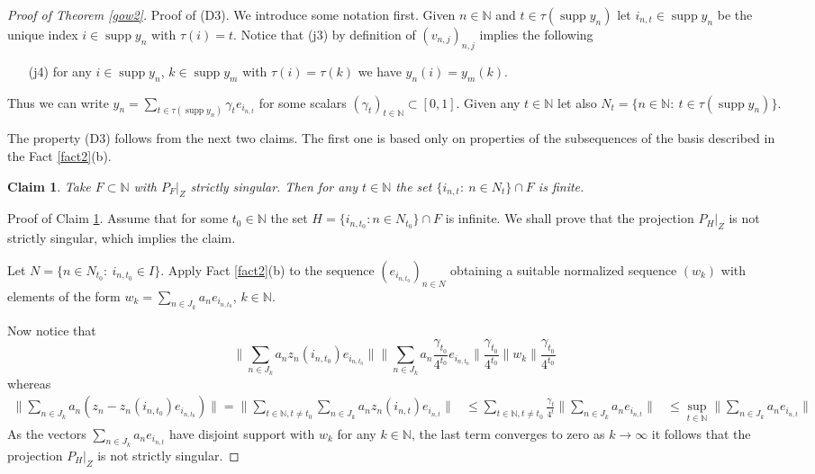\documentclass{amsart}
\newtheorem{claim}{Claim}
\numberwithin{subsection}{section}
\numberwithin{equation}{section}
\begin{document}
\begin{proof}[Proof of Theorem \ref{gow2}]
Proof of (D3). We introduce some notation first. Given $n\in{{\mathbb{N}}}$ and $t\in\tau (\operatorname{supp} y_n)$ let $i_{n,t}\in\operatorname{supp} y_n$ be the unique index $i\in \operatorname{supp} y_n$ with $\tau(i)=t$. Notice that (j3) by definition of $(v_{n,j})_{n,j}$ implies the following 
\begin{enumerate}
\item[(j4)] for any $i\in\operatorname{supp} y_n$, $k\in\operatorname{supp} y_m$ with  $\tau(i)=\tau(k)$ we have $y_n(i)=y_m(k)$.
\end{enumerate}
Thus we can write $y_n=\sum_{t\in \tau(\operatorname{supp} y_n)}\gamma_te_{i_{n,t}}$ for some  scalars $(\gamma_t)_{t\in{{\mathbb{N}}}}\subset [0,1]$. 
Given any $t\in{{\mathbb{N}}}$ let also $N_t=\{n\in{{\mathbb{N}}}:\ t\in\tau (\operatorname{supp} y_n)\}$. 

The property (D3) follows from the next two claims. The first one is based only on properties of the subsequences of the basis described in the Fact \ref{fact2}(b). 
\begin{claim}\label{claim3}
Take $F\subset{{\mathbb{N}}}$ with $P_F|_Z$ strictly singular. Then for any $t\in{{\mathbb{N}}}$ the set $\{i_{n,t}: \ n\in N_t\}\cap F$ is finite.
\end{claim}
Proof of Claim \ref{claim3}. Assume that for some $t_0\in{{\mathbb{N}}}$ the set $H=\{i_{n,t_0}: n\in N_{t_0}\}\cap F$ is infinite. We shall prove that the projection $P_H|_Z$ is not strictly singular, which implies the claim.

Let $N=\{n\in N_{t_0}: \ i_{n,t_0}\in I\}$. Apply Fact \ref{fact2}(b) to the sequence $(e_{i_{n,t_0}})_{n\in N}$ obtaining a suitable normalized sequence $(w_k)$ with elements of the form $w_k=\sum_{n\in J_k}a_ne_{i_{n,t_0}}$, $k\in {{\mathbb{N}}}$.  

Now notice that
$$
{\lVert \sum_{n\in J_k}a_nz_{n}(i_{n,t_0})e_{i_{n,t_0}}\rVert}{\lVert \sum_{n\in J_k}a_n\frac{\gamma_{t_0}}{4^{t_0}}e_{i_{n,t_0}}\rVert}\frac{\gamma_{t_0}}{4^{t_0}}{\lVert w_k\rVert}\frac{\gamma_{t_0}}{4^{t_0}}
$$
whereas
\begin{align*}
{\lVert \sum_{n\in J_k}a_n(z_{n}-z_{n}(i_{n,t_0})e_{i_{n,t_0}})\rVert}={\lVert \sum_{t\in{{\mathbb{N}}},t\neq t_0}\sum_{n\in J_k}a_nz_{n}(i_{n,t})e_{i_{n,t}}\rVert}
&\leq \sum_{t\in{{\mathbb{N}}},t\neq t_0}\frac{\gamma_t}{4^{t}}{\lVert \sum_{n\in J_k}a_ne_{i_{n,t}}\rVert}
&\leq \sup_{t\in{{\mathbb{N}}}}{\lVert \sum_{n\in J_k}a_ne_{i_{n,t}}\rVert}
\end{align*}
As the vectors $\sum_{n\in J_k}a_ne_{i_{n,t}}$ have disjoint support with $w_k$ for any $k\in{{\mathbb{N}}}$, the last term converges to zero as $k\to\infty$ it follows that the projection $P_H|_Z$ is not strictly singular.


\end{proof}
\end{document}

